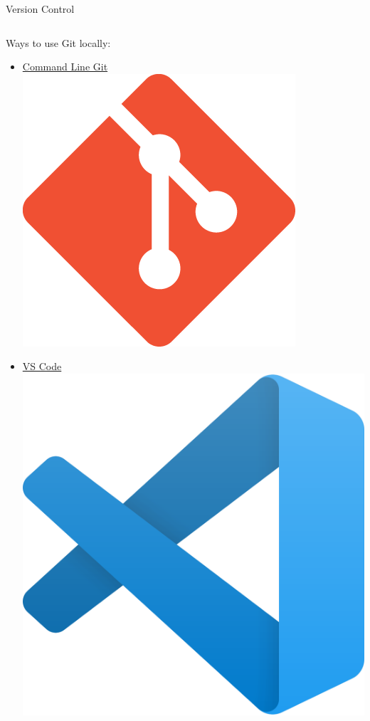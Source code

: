 \documentclass{beamer} %
\begin{document}
  \begin{frame}{Version Control}
    \begin{columns}
      \begin{column}{0.5\textwidth}
        Ways to use Git locally:
        \begin{itemize}
          \item \href{https://git-scm.com/}{Command Line Git \includegraphics[height=.05\textheight]{git}}
          \item \href{https://code.visualstudio.com/}{VS Code \includegraphics[height=.05\textheight]{vscode}}

\end{itemize}
\end{column}
\end{columns}
\end{frame}
\end{document}
